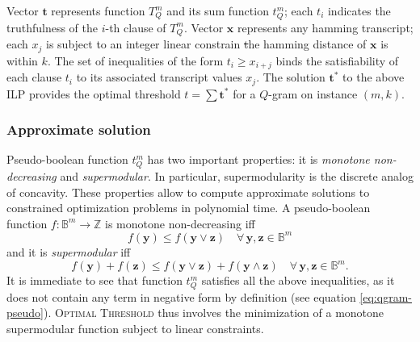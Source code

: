 Vector $\mathbf{t}$ represents function $T_{Q}^{m}$ and its sum function $t_{Q}^{m}$; each $t_i$ indicates the truthfulness of the $i$-th clause of $T_{Q}^{m}$.
Vector $\mathbf{x}$ represents any hamming transcript; each $x_j$ is subject to an integer linear constrain \st the hamming distance of $\mathbf{x}$ is within $k$.
The set of inequalities of the form $t_i \geq x_{i+j}$ binds the satisfiability of each clause $t_i$ to its associated transcript values $x_j$.
The solution $\mathbf{t}^*$ to the above ILP provides the optimal threshold $t=\sum \mathbf{t}^*$ for a $Q$-gram on instance $(m,k)$.

\subsubsection{Approximate solution}

Pseudo-boolean function $t_{Q}^{m}$ has two important properties: it is \emph{monotone non-decreasing} and \emph{supermodular}.
In particular, supermodularity is the discrete analog of concavity.
These properties allow to compute approximate solutions to constrained optimization problems in polynomial time.
A pseudo-boolean function $f : \mathbb{B}^m \rightarrow \mathbb{Z}$ is monotone non-decreasing iff 
\begin{equation}
\label{eq:monotone-non-decreasing}
f(\mathbf{y}) \leq f(\mathbf{y} \vee \mathbf{z}) \quad \forall \, \mathbf{y}, \mathbf{z} \in \mathbb{B}^m
\end{equation}
and it is \emph{supermodular} iff 
\begin{equation}
\label{eq:supermodularity}
f(\mathbf{y}) + f(\mathbf{z}) \leq f(\mathbf{y} \vee \mathbf{z}) + f(\mathbf{y} \wedge \mathbf{z}) \quad \forall \, \mathbf{y}, \mathbf{z} \in \mathbb{B}^m.
\end{equation}
It is immediate to see that function $t_{Q}^{m}$ satisfies all the above inequalities, as it does not contain any term in negative form by definition (see equation \ref{eq:qgram-pseudo}).
\textsc{Optimal Threshold} thus involves the minimization of a monotone supermodular function subject to linear constraints.

